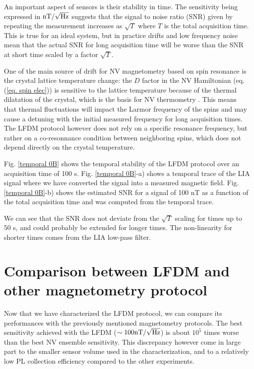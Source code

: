 \documentclass[a4paper, 11pt]{report}
\begin{document}
An important aspect of sensors is their stability in time. The sensitivity being expressed in $\rm{nT} / \sqrt{\rm Hz}$ suggests that the signal to noise ratio (SNR) given by repeating the measurement increases as $\sqrt{T}$ where $T$ is the total acquisition time. This is true for an ideal system, but in practice drifts and low frequency noise mean that the actual SNR for long acquisition time will be worse than the SNR at short time scaled by a factor $\sqrt{T}$.

One of the main source of drift for NV magnetometry based on spin resonance is the crystal lattice temperature change: the $D$ factor in the NV Hamiltonian (eq. (\ref{eq. spin elec})) is sensitive to the lattice temperature because of the thermal dilatation of the crystal, which is the basis for NV thermometry \citep{kucsko2013nanometre}. This means that thermal fluctuations will impact the Larmor frequency of the spins and may cause a detuning with the initial measured frequency for long acquisition times. The LFDM protocol however does not rely on a specific resonance frequency, but rather on a co-resonnance condition between neighboring spins, which does not depend directly on the crystal temperature.

Fig. \ref{temporal 0B} shows the temporal stability of the LFDM protocol over an acquisition time of 100 s. Fig. \ref{temporal 0B}-a) shows a temporal trace of the LIA signal where we have converted the signal into a measured magnetic field. Fig. \ref{temporal 0B}-b) shows the estimated SNR for a signal of 100 nT as a function of the total acquisition time and was computed from the temporal trace.

We can see that the SNR does not deviate from the $\sqrt{T}$ scaling for times up to 50 s, and could probably be extended for longer times. The non-linearity for shorter times comes from the LIA low-pass filter.

\section{Comparison between LFDM and other magnetometry protocol}
\label{sec 4.6}
Now that we have characterized the LFDM protocol, we can compare its performances with the previously mentioned magnetometry protocols. The best sensitivity achieved with the LFDM ($\sim 100 \rm{nT} / \sqrt{\rm Hz}$) is about $10^5$ times worse than the best NV ensemble sensitivity. This discrepancy however come in large part to the smaller sensor volume used in the characterization, and to a relatively low PL collection efficiency compared to the other experiments.
\end{document}

